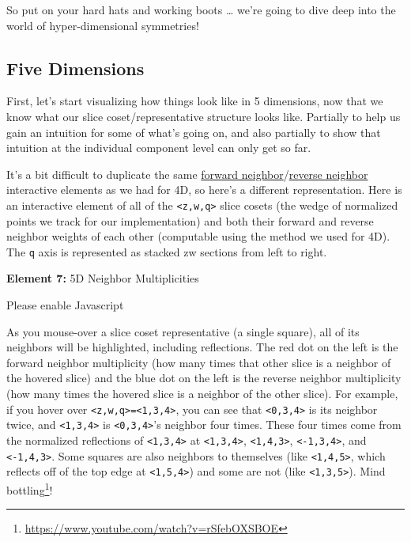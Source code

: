 \documentclass[]{article}
\renewcommand{\href}[2]{#2\footnote{\url{#1}}}
\begin{document}
So put on your hard hats and working boots \ldots{} we're going to dive deep
into the world of hyper-dimensional symmetries!

\hypertarget{five-dimensions}{%
\subsection{Five Dimensions}\label{five-dimensions}}

First, let's start visualizing how things look like in 5 dimensions, now that we
know what our slice coset/representative structure looks like. Partially to help
us gain an intuition for some of what's going on, and also partially to show
that intuition at the individual component level can only get so far.

It's a bit difficult to duplicate the same
\protect\hyperlink{golSyms4DForward}{forward
neighbor}/\protect\hyperlink{golSyms4DReverse}{reverse neighbor} interactive
elements as we had for 4D, so here's a different representation. Here is an
interactive element of all of the \texttt{\textless{}z,w,q\textgreater{}} slice
cosets (the wedge of normalized points we track for our implementation) and both
their forward and reverse neighbor weights of each other (computable using the
method we used for 4D). The \texttt{q} axis is represented as stacked zw
sections from left to right.

\leavevmode\hypertarget{golSyms5D}{}%
\textbf{Element 7:} 5D Neighbor Multiplicities

\leavevmode\hypertarget{golSyms5DCont}{}%
Please enable Javascript

As you mouse-over a slice coset representative (a single square), all of its
neighbors will be highlighted, including reflections. The red dot on the left is
the forward neighbor multiplicity (how many times that other slice is a neighbor
of the hovered slice) and the blue dot on the left is the reverse neighbor
multiplicity (how many times the hovered slice is a neighbor of the other
slice). For example, if you hover over
\texttt{\textless{}z,w,q\textgreater{}=\textless{}1,3,4\textgreater{}}, you can
see that \texttt{\textless{}0,3,4\textgreater{}} is its neighbor twice, and
\texttt{\textless{}1,3,4\textgreater{}} is
\texttt{\textless{}0,3,4\textgreater{}}'s neighbor four times. These four times
come from the normalized reflections of \texttt{\textless{}1,3,4\textgreater{}}
at \texttt{\textless{}1,3,4\textgreater{}},
\texttt{\textless{}1,4,3\textgreater{}},
\texttt{\textless{}-1,3,4\textgreater{}}, and
\texttt{\textless{}-1,4,3\textgreater{}}. Some squares are also neighbors to
themselves (like \texttt{\textless{}1,4,5\textgreater{}}, which reflects off of
the top edge at \texttt{\textless{}1,5,4\textgreater{}}) and some are not (like
\texttt{\textless{}1,3,5\textgreater{}}).
\href{https://www.youtube.com/watch?v=rSfebOXSBOE}{Mind bottling}!
\end{document}
